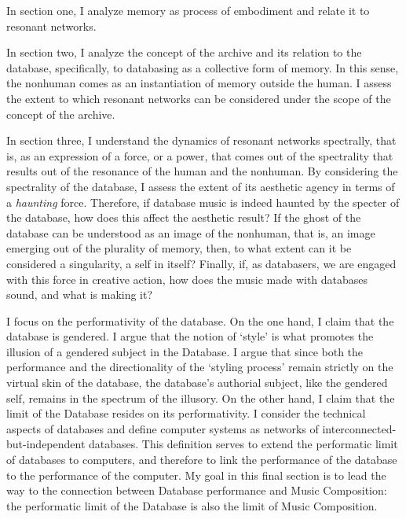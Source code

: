 In section one, I analyze memory as process of embodiment and relate it to resonant networks.

In section two, I analyze the concept of the archive and its relation to the database, specifically, to databasing as a collective form of memory. In this sense, the nonhuman comes as an instantiation of memory outside the human. I assess the extent to which resonant networks can be considered under the scope of the concept of the archive. 

In section three, I understand the dynamics of resonant networks spectrally, that is, as an expression of a force, or a power, that comes out of the spectrality that results out of the resonance of the human and the nonhuman. By considering the spectrality of the database, I assess the extent of its aesthetic agency in terms of a \textit{haunting} force. Therefore, if database music is indeed haunted by the specter of the database, how does this affect the aesthetic result? If the ghost of the database can be understood as an image of the nonhuman, that is, an image emerging out of the plurality of memory, then, to what extent can it be considered a singularity, a self in itself? Finally, if, as databasers, we are engaged with this force in creative action, how does the music made with databases sound, and what is making it?







I focus on the performativity of the database. On the one hand, I claim that the database is gendered. I argue that the notion of `style' is what promotes the illusion of a gendered subject in the Database. I argue that since both the performance and the directionality of the `styling process' remain strictly on the virtual skin of the database, the database's authorial subject, like the gendered self, remains in the spectrum of the illusory. On the other hand, I claim that the limit of the Database resides on its performativity. I consider the technical aspects of databases and define computer systems as networks of interconnected-but-independent databases. This definition serves to extend the performatic limit of databases to computers, and therefore to link the performance of the database to the performance of the computer. My goal in this final section is to lead the way to the connection between Database performance and Music Composition: the performatic limit of the Database is also the limit of Music Composition.


